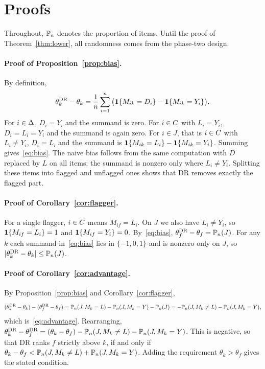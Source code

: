 \section{Proofs}
\label{app:proofs}

Throughout, $\mathbb{P}_n$ denotes the proportion of items. Until the proof of Theorem~\ref{thm:lower}, all randomness comes from the phase-two design.

\paragraph{Proof of Proposition~\ref{prop:bias}.} By definition,
\[
\theta^{\mathrm{DR}}_k-\theta_k=\frac1n\sum_{i=1}^n\big(\mathbf{1}\{M_{ik}=D_i\}-\mathbf{1}\{M_{ik}=Y_i\}\big).
\]
For $i\in\Delta$, $D_i=Y_i$ and the summand is zero. For $i\in C$ with $L_i=Y_i$, $D_i=L_i=Y_i$ and the summand is again zero. For $i\in J$, that is $i\in C$ with $L_i\ne Y_i$, $D_i=L_i$ and the summand is $\mathbf{1}\{M_{ik}=L_i\}-\mathbf{1}\{M_{ik}=Y_i\}$. Summing gives~\eqref{eq:bias}. The naive bias follows from the same computation with $D$ replaced by $L$ on all items: the summand is nonzero only where $L_i\ne Y_i$. Splitting these items into flagged and unflagged ones shows that DR removes exactly the flagged part. \hfill\BlackBox

\paragraph{Proof of Corollary~\ref{cor:flagger}.} For a single flagger, $i\in C$ means $M_{if}=L_i$. On $J$ we also have $L_i\ne Y_i$, so $\mathbf{1}\{M_{if}=L_i\}=1$ and $\mathbf{1}\{M_{if}=Y_i\}=0$. By~\eqref{eq:bias}, $\theta^{\mathrm{DR}}_f-\theta_f=\mathbb{P}_n(J)$. For any $k$ each summand in~\eqref{eq:bias} lies in $\{-1,0,1\}$ and is nonzero only on $J$, so $|\theta^{\mathrm{DR}}_k-\theta_k|\le\mathbb{P}_n(J)$. \hfill\BlackBox

\paragraph{Proof of Corollary~\ref{cor:advantage}.} By Proposition~\ref{prop:bias} and Corollary~\ref{cor:flagger},
\[
(\theta^{\mathrm{DR}}_k-\theta_k)-(\theta^{\mathrm{DR}}_f-\theta_f)=\mathbb{P}_n(J,M_k=L)-\mathbb{P}_n(J,M_k=Y)-\mathbb{P}_n(J)=-\mathbb{P}_n(J,M_k\ne L)-\mathbb{P}_n(J,M_k=Y),
\]
which is~\eqref{eq:advantage}. Rearranging, $\theta^{\mathrm{DR}}_k-\theta^{\mathrm{DR}}_f=(\theta_k-\theta_f)-\mathbb{P}_n(J,M_k\neq L)-\mathbb{P}_n(J,M_k=Y)$. This is negative, so that DR ranks $f$ strictly above $k$, if and only if $\theta_k-\theta_f<\mathbb{P}_n(J,M_k\neq L)+\mathbb{P}_n(J,M_k=Y)$. Adding the requirement $\theta_k>\theta_f$ gives the stated condition. \hfill\BlackBox

